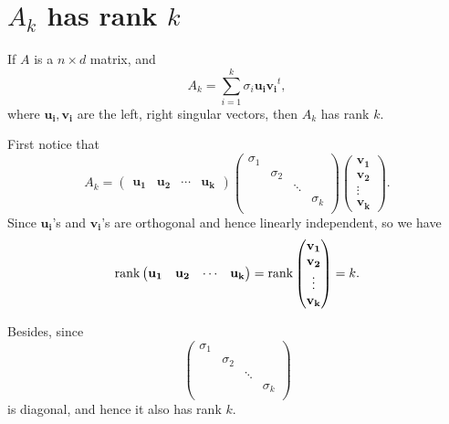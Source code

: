 \section{\(A_k\) has rank \(k\)} \label{appendix: Ak rank k}
\begin{claim}
	If \(A\) is a \(n \times d\) matrix, and  
\[
	A_k=\sum_{i=1}^{k} \sigma _i \mathbf{u_i} \mathbf{v_i}^t  , 
\] 
where \(\mathbf{u_i}, \mathbf{v_i}  \) are the left, right singular vectors, then \(A_k\) has rank \(k\).
\end{claim}
\begin{explanation}
	First notice that
	\[
		A_k = \begin{pmatrix}
    \mathbf{u_1}  & \mathbf{u_2}  & \cdots  &\mathbf{u_k}
  \end{pmatrix}
  \begin{pmatrix}
    \sigma _1 &  &  &  \\
     &  \sigma _2&   &  \\
     &  &  \ddots&  \\
     &  &  & \sigma _k \\
  \end{pmatrix}
  \begin{pmatrix}
     \mathbf{v_1}  \\
      \mathbf{v_2} \\
      \vdots\\
      \mathbf{v_k}
  \end{pmatrix}.
	\]
Since \(\mathbf{u_i} \)'s and \(\mathbf{v_i} \)'s are orthogonal and hence linearly independent, so we have 
\[
	\rank\begin{pmatrix}
    \mathbf{u_1}  & \mathbf{u_2}  & \cdots  &\mathbf{u_k}
  \end{pmatrix} = \rank \begin{pmatrix}
     \mathbf{v_1}  \\
      \mathbf{v_2} \\
      \vdots\\
      \mathbf{v_k}
  \end{pmatrix} = k.
\] 

Besides, since 
\[
  \begin{pmatrix}
    \sigma _1 &  &  &  \\
     &  \sigma _2&   &  \\
     &  &  \ddots&  \\
     &  &  & \sigma _k \\
  \end{pmatrix}	
\]
is diagonal, and hence it also has rank \(k\). 


\end{explanation}
